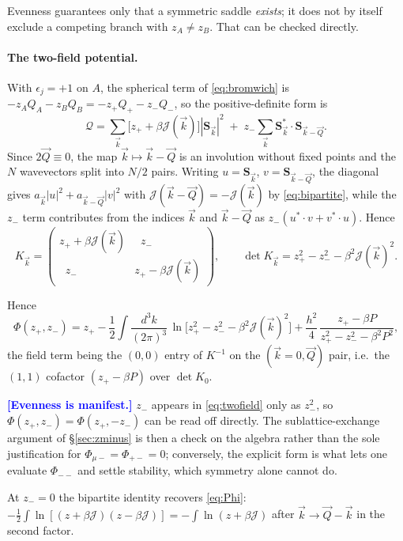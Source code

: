 \documentclass[11pt,a4paper]{article}
\newcommand{\Jc}{\mathcal{J}}
\newcommand{\bk}{\vec k}
\newcommand{\bQ}{\vec Q}
\newcommand{\dk}{\frac{d^3k}{(2\pi)^3}}
\newcommand{\FLAG}[1]{\textcolor{blue}{\textbf{[#1]}}}
\newcommand{\Jc}{\mathcal{J}}
\newcommand{\bk}{\vec k}
\newcommand{\bQ}{\vec Q}
\newcommand{\dk}{\frac{d^3k}{(2\pi)^3}}
\newcommand{\FLAG}[1]{\textcolor{blue}{\textbf{[#1]}}}
\begin{document}
Evenness guarantees only that a symmetric saddle \emph{exists}; it does not by itself
exclude a competing branch with $z_A\neq z_B$. That can be checked directly.

\paragraph{The two-field potential.} With $\epsilon_j=+1$ on $A$, the spherical term of
\eqref{eq:bromwich} is $-z_AQ_A-z_BQ_B=-z_+Q_+-z_-Q_-$, so the positive-definite form is
\begin{equation}
  \mathcal Q=\sum_{\bk}\big[z_++\beta\Jc(\bk)\big]|\bm S_{\bk}|^2
   \;+\;z_-\sum_{\bk}\bm S^{*}_{\bk}\cdot\bm S_{\bk-\bQ} .
\end{equation}
Since $2\bQ\equiv0$, the map $\bk\mapsto\bk-\bQ$ is an involution without fixed points and
the $N$ wavevectors split into $N/2$ pairs. Writing $u=\bm S_{\bk}$, $v=\bm S_{\bk-\bQ}$,
the diagonal gives $a_{\bk}|u|^2+a_{\bk-\bQ}|v|^2$ with $\Jc(\bk-\bQ)=-\Jc(\bk)$ by
\eqref{eq:bipartite}, while the $z_-$ term contributes from the indices $\bk$ and $\bk-\bQ$
as $z_-(u^{*}\!\cdot v+v^{*}\!\cdot u)$. Hence
\begin{equation}
  K_{\bk}=\begin{pmatrix} z_++\beta\Jc(\bk) & \;\;z_-\\ \;\;z_- & z_+-\beta\Jc(\bk)\end{pmatrix},
  \qquad
  \det K_{\bk} = z_+^2-z_-^2-\beta^2\Jc(\bk)^2 .
  \label{eq:twofieldkernel}
\end{equation}


Hence
\begin{equation}
  \Phi(z_+,z_-)=z_+-\frac12\int\!\dk\,\ln\!\big[z_+^2-z_-^2-\beta^2\Jc(\bk)^2\big]
   +\frac{h^2}{4}\,\frac{z_+-\beta P}{z_+^2-z_-^2-\beta^2P^2},
  \label{eq:twofield}
\end{equation}
the field term being the $(0,0)$ entry of $K^{-1}$ on the $(\bk{=}0,\bQ)$ pair, i.e.\ the
$(1,1)$ cofactor $(z_+-\beta P)$ over $\det K_0$.

\FLAG{Evenness is manifest.} $z_-$ appears in \eqref{eq:twofield} only as $z_-^2$, so
$\Phi(z_+,z_-)=\Phi(z_+,-z_-)$ can be read off directly. The sublattice-exchange argument of
\S\ref{sec:zminus} is then a check on the algebra rather than the sole justification for
$\Phi_{\mu-}=\Phi_{+-}=0$; conversely, the explicit form is what lets one evaluate
$\Phi_{--}$ and settle stability, which symmetry alone cannot do.

At $z_-=0$ the bipartite identity recovers \eqref{eq:Phi}:
$-\tfrac12\int\ln[(z+\beta\Jc)(z-\beta\Jc)]=-\int\ln(z+\beta\Jc)$ after $\bk\to\bQ-\bk$ in
the second factor.
\end{document}
